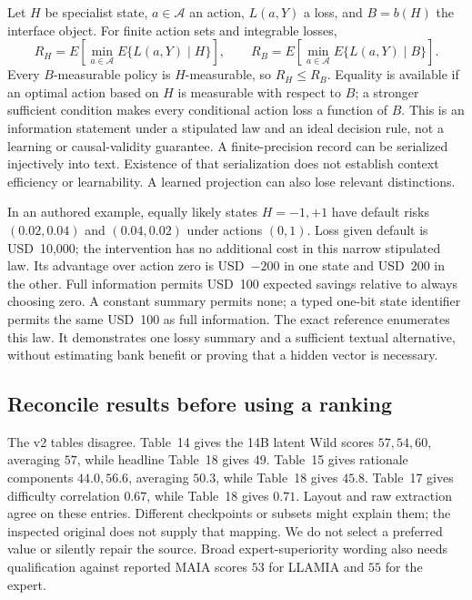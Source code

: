 Let $H$ be specialist state, $a\in\mathcal A$ an action, $L(a,Y)$ a loss, and $B=b(H)$ the interface object. For finite action sets and integrable losses,
\begin{equation}
 R_H=E\!\left[\min_{a\in\mathcal A}E\{L(a,Y)\mid H\}\right],\qquad
 R_B=E\!\left[\min_{a\in\mathcal A}E\{L(a,Y)\mid B\}\right].
 \label{eq:exec24-collaboration-sufficiency}
\end{equation}
Every $B$-measurable policy is $H$-measurable, so $R_H\leq R_B$. Equality is available if an optimal action based on $H$ is measurable with respect to $B$; a stronger sufficient condition makes every conditional action loss a function of $B$. This is an information statement under a stipulated law and an ideal decision rule, not a learning or causal-validity guarantee. A finite-precision record can be serialized injectively into text. Existence of that serialization does not establish context efficiency or learnability. A learned projection can also lose relevant distinctions.\citep{exec24_collaboration_reference}

In an authored example, equally likely states $H=-1,+1$ have default risks $(0.02,0.04)$ and $(0.04,0.02)$ under actions $(0,1)$. Loss given default is USD~10,000; the intervention has no additional cost in this narrow stipulated law. Its advantage over action zero is USD~$-200$ in one state and USD~$200$ in the other. Full information permits USD~100 expected savings relative to always choosing zero. A constant summary permits none; a typed one-bit state identifier permits the same USD~100 as full information. The exact reference enumerates this law. It demonstrates one lossy summary and a sufficient textual alternative, without estimating bank benefit or proving that a hidden vector is necessary.\citep{exec24_collaboration_reference}

\subsection{Reconcile results before using a ranking}
The v2 tables disagree. Table~14 gives the 14B latent Wild scores $57,54,60$, averaging $57$, while headline Table~18 gives $49$. Table~15 gives rationale components $44.0,56.6$, averaging $50.3$, while Table~18 gives $45.8$. Table~17 gives difficulty correlation $0.67$, while Table~18 gives $0.71$. Layout and raw extraction agree on these entries. Different checkpoints or subsets might explain them; the inspected original does not supply that mapping. We do not select a preferred value or silently repair the source. Broad expert-superiority wording also needs qualification against reported MAIA scores $53$ for LLAMIA and $55$ for the expert.\citep{exec24_collaboration_original,exec24_collaboration_reference}

